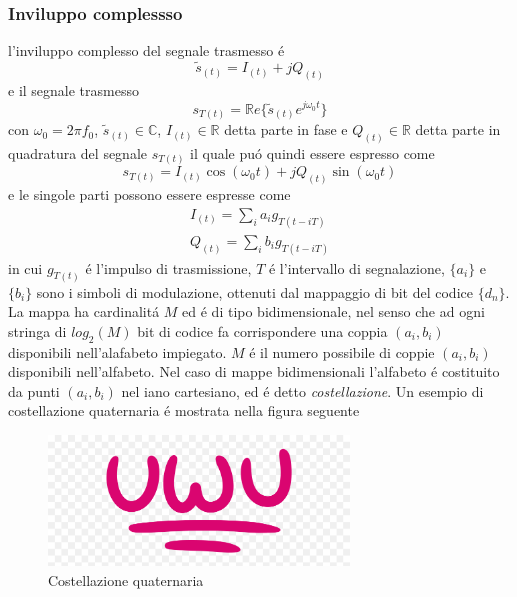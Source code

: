         \subsubsection{Inviluppo complessso}
            l'inviluppo complesso del segnale trasmesso é 
            \[
                \tilde{s}_{(t)} = I_{(t)} +j Q_{(t)}      
            \]
            e il segnale trasmesso
            \[
                  s_{T(t)} = \mathbb{R}e\{\tilde{s}_{(t)}e^{j\omega_0t}\}
            \]
            con $\omega_0 = 2\pi f_0$, $\tilde{s}_{(t)}\in \mathbb{C}$, $I_{(t)}\in \mathbb{R}$ detta parte in fase e 
            $Q_{(t)}\in \mathbb{R}$ detta parte in quadratura del segnale $s_{T(t)}$ il quale puó quindi essere espresso 
            come 
            \[
                s_{T(t)} =I_{(t)}\cos(\omega_0t)+jQ_{(t)}\sin(\omega_0t)  
            \]  
            e le singole parti possono essere espresse come 
            \begin{gather}
                I_{(t)} = \sum_{i}a_ig_{T(t-iT)}\nonumber \\
                Q_{(t)} = \sum_{i}b_ig_{T(t-iT)}\nonumber
            \end{gather}
            in cui $g_{T(t)}$ é l'impulso di trasmissione, $T$ é l'intervallo di segnalazione,
            $\{a_i\}$ e $\{b_i\}$ sono i simboli di modulazione, ottenuti dal mappaggio di bit del codice $\{d_n\}$.
            La mappa ha cardinalitá $M$ ed é di tipo bidimensionale, nel senso che ad ogni stringa di $log_2(M)$ bit di codice
            fa corrispondere una coppia $(a_i,b_i)$ disponibili nell'alafabeto impiegato. $M$ é il numero possibile di coppie $(a_i,b_i)$ 
            disponibili nell'alfabeto. Nel caso di mappe bidimensionali l'alfabeto é costituito da punti $(a_i,b_i)$ nel iano cartesiano,
            ed é detto \emph{costellazione}. Un esempio di costellazione quaternaria é mostrata nella figura seguente
            \begin{figure}[H]
                \centering
                \includegraphics*[width = 8cm]{media/uwu.png}
                \caption{Costellazione quaternaria}
            \end{figure}

